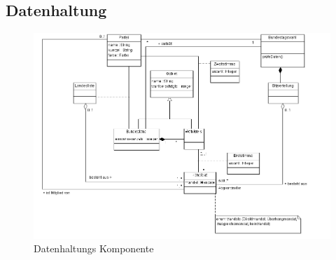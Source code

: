 \documentclass[12pt,a4paper,titlepage]{article}
\begin{document}
\subsection{Datenhaltung}
\begin{figure}[!ht]
\includegraphics[scale=0.4]{Datenhaltung-Ausschnitt} \caption{Datenhaltungs Komponente} 
\end{figure}
\end{document}
